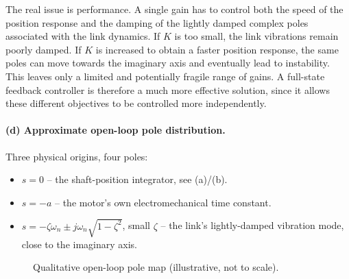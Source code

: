 \documentclass[a4paper,11pt]{article}
\begin{document}
The real issue is performance. A single gain has to control both the speed of the position response and the damping of the lightly damped complex poles associated with the link dynamics. If $K$ is too small, the link vibrations remain poorly damped. If $K$ is increased to obtain a faster position response, the same poles can move towards the imaginary axis and eventually lead to instability. This leaves only a limited and potentially fragile range of gains. A full-state feedback controller is therefore a much more effective solution, since it allows these different objectives to be controlled more independently.


\paragraph{(d) Approximate open-loop pole distribution.}
Three physical origins, four poles:
\begin{itemize}
  \item $s=0$ -- the shaft-position integrator, see (a)/(b).
  \item $s=-a$ -- the motor's own electromechanical time constant.
  \item $s=-\zeta\omega_n \pm j\omega_n\sqrt{1-\zeta^2}$, small $\zeta$ -- the link's
  lightly-damped vibration mode, close to the imaginary axis.
\end{itemize}

\begin{figure}[h]
\centering
{}
\caption{Qualitative open-loop pole map (illustrative, not to scale).}
\label{fig:q1-poles}
\end{figure}
\end{document}
